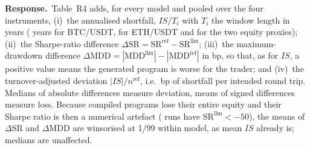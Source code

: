 \documentclass[11pt,a4paper]{article}
\newcommand{\response}{\par\noindent\textbf{Response.}\ }
\begin{document}
\response Table~R4 adds, for every model and pooled over the four instruments, (i)~the annualised shortfall, $IS/T_i$ with $T_i$ the window length in years (\RevYearsBtc{} years for BTC/USDT, \RevYearsEth{} for ETH/USDT and \RevYearsSpy{} for the two equity proxies); (ii)~the Sharpe-ratio difference $\Delta\mathrm{SR}=\mathrm{SR}^{\mathrm{ref}}-\mathrm{SR}^{\mathrm{llm}}$; (iii)~the maximum-drawdown difference $\Delta\mathrm{MDD}=|\mathrm{MDD}^{\mathrm{llm}}|-|\mathrm{MDD}^{\mathrm{ref}}|$ in bp, so that, as for $IS$, a positive value means the generated program is worse for the trader; and (iv)~the turnover-adjusted deviation $|IS|/n^{\mathrm{ref}}$, i.e.\ bp of shortfall per intended round trip. Medians of absolute differences measure deviation, means of signed differences measure loss. Because \RevBustRuns{} compiled programs lose their entire equity and their Sharpe ratio is then a numerical artefact (\RevSharpeBelowFifty{} runs have $\mathrm{SR}^{\mathrm{llm}}<-50$), the means of $\Delta\mathrm{SR}$ and $\Delta\mathrm{MDD}$ are winsorised at 1/99 within model, as mean $IS$ already is; medians are unaffected.

\begin{table}[h]\centering\scriptsize\setlength{\tabcolsep}{3pt}
\caption*{\textbf{Table R4.} Annualised, risk-adjusted and turnover-adjusted shortfall, four instruments pooled, compiled runs. $IS$/yr is $IS$ divided by the window length in years; $\Delta\mathrm{SR}=\mathrm{SR}^{\mathrm{ref}}-\mathrm{SR}^{\mathrm{llm}}$; $\Delta\mathrm{MDD}=|\mathrm{MDD}^{\mathrm{llm}}|-|\mathrm{MDD}^{\mathrm{ref}}|$ in bp (positive: the generated program has the deeper drawdown); $|IS|$/trade is $|IS|$ per round trip of the reference. Means of $\Delta\mathrm{SR}$ and $\Delta\mathrm{MDD}$ winsorised 1/99 within model; unclustered $t$-statistics in brackets.}
\resizebox{\textwidth}{!}{}
\end{table}
\end{document}
